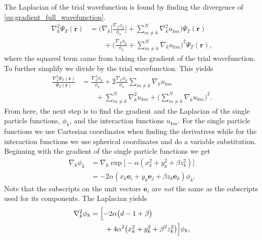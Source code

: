 \documentclass[
    a4paper, aps, twocolumn, floatfix, superscriptaddress,
    nofootinbib]{revtex4-1}
\newcommand{\vf}{\mathbf}
\newcommand{\1}{\mathds{1}}
\begin{document}
    The Laplacian of the trial wavefunction is found by finding the
    divergence of \autoref{eq:gradient_full_wavefunction}.
    \begin{align}
        \nabla_k^2\Psi_T(\vf{r})
        &=
        \Biggl(
            \nabla_k\Biggl[
                \frac{\nabla_k\phi_k}{\phi_k}
            \Biggr]
            +
            \sum_{m \neq k}^N \nabla_k^2 u_{km}
        \Biggr)\Psi_T(\vf{r})
        \\
        &\qquad
        +
        \Biggl(
            \frac{\nabla_k\phi_k}{\phi_k}
            + \sum_{m \neq k}^N
            \nabla_k u_{km}
        \Biggr)^2
        \Psi_T(\vf{r}),
    \end{align}
    where the squared term came from taking the gradient of the trial
    wavefunction.  To further simplify we divide by the trial
    wavefunction. This yields
    \begin{align}
        \frac{\nabla_k^2\Psi_T(\vf{r})}{\Psi_T(\vf{r})}
        &=
        \frac{\nabla_k^2\phi_k}{\phi_k}
        + 2\frac{\nabla_k\phi_k}{\phi_k}
        \sum_{m \neq k}\nabla_k u_{km}
        \nonumber \\
        &\qquad
        + \sum_{m\neq k}^N\nabla_k^2 u_{km}
        + \Biggl(
            \sum_{m \neq k}^N\nabla_k u_{km}
        \Biggr)^2.
    \end{align}
    From here, the next step is to find the gradient and the Laplacian of
    the single particle functions, $\phi_k$, and the interaction
    functions $u_{km}$. For the single particle functions we use
    Cartesian coordinates when finding the derivatives while for
    the interaction functions we use spherical coordinates and do a
    variable substitution. Beginning with the gradient of the single
    particle functions we get
    \begin{align}
        \nabla_k\phi_k
        &=
        \nabla_k\exp\bigl[
            -\alpha(x_k^2 + y_k^2 + \beta z_k^2)
        \bigr] \\
        &=
        -2\alpha
        (x_k\vf{e}_i + y_k\vf{e}_j + \beta z_k\vf{e}_k)
        \phi_k.
    \end{align}
    Note that the subscripts on the unit vectors $\vf{e}_i$ are
    \emph{not} the same as the subscripts used for its components. The
    Laplacian yields
    \begin{align}
        \nabla_k^2\phi_k
        &=
        \Bigl[
            -2\alpha
            \big(
                d - 1 + \beta
            \bigr)
            \nonumber \\
            &\qquad
            + 4\alpha^2
            \bigl(
                x_k^2 + y_k^2 + \beta^2z_k^2
            \bigr)
        \Bigr]
        \phi_k,
    \end{align}
\end{document}
